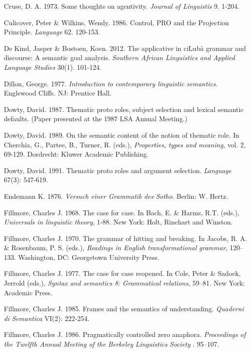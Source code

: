 \documentclass[output=paper]{langsci/langscibook}
\begin{document}
Cruse, D. A. 1973. Some thoughts on agentivity. \textit{Journal of Linguistis }9. 1-204.

Culicover, Peter \& Wilkins, Wendy. 1986. Control, PRO and the Projection Principle. \textit{Language}\textit{ }62. 120-153.

De Kind, Jasper \& Bostoen, Koen. 2012. The applicative in ciLubà grammar and discourse: A semantic goal analysis. \textit{Southern African Linguistics and Applied Language Studies }30(1). 101-124.

Dillon, George. 1977. \textit{Introduction to contemporary linguistic semantics.} Englewood Cliffs. NJ: Prentice Hall.

Dowty, David. 1987. Thematic proto roles, subject selection and lexical semantic defaults. (Paper presented at the 1987 LSA Annual Meeting.)

Dowty, David. 1989. On the semantic content of the notion of thematic role. In Cherchia,   G., Partee, B., Turner, R. (eds.), \textit{Properties, types and meaning, }vol. 2\textit{, }69-129.   Dordrecht: Kluwer Academic Publishing.

Dowty, David. 1991. Thematic proto roles and argument selection. \textit{Language} 67(3): 547-619.

Endemann K. 1876. \textit{Versuch einer Grammatik des Sotho}. Berlin: W. Hertz. 

Fillmore, Charles J. 1968. The case for case. In Bach, E. \& Harms, R.T.  (eds.), \textit{Universals in linguistic theory}, 1-88. New York: Holt, Rinehart and Winston. 

Fillmore, Charles J. 1970. The grammar of hitting and breaking. In Jacobs, R. A. \& Rosenbaum, P. S. (eds.), \textit{Readings in English transformational grammar}, 120–133. Washington, DC: Georgetown University Press.

Fillmore, Charles J. 1977. The case for case reopened. In Cole, Peter \& Sadock, Jerrold (eds.),   \textit{Syntax and semantics 8: Grammatical relations}, 59–81. New York: Academic Press.

Fillmore, Charles J. 1985. Frames and the semantics of understanding. \textit{Quaderni di Semantica} VI(2): 222-254.

Fillmore, Charles J. 1986. Pragmatically controlled zero anaphora. \textit{Proceedings of the Twelfth Annual Meeting of the }\textit{Ber}\textit{k}\textit{ele}\textit{y}\textit{ }\textit{Li}\textit{n}\textit{g}\textit{u}\textit{is}\textit{t}\textit{ics}\textit{ }\textit{Socie}\textit{ty} . 95–107.
\end{document}
